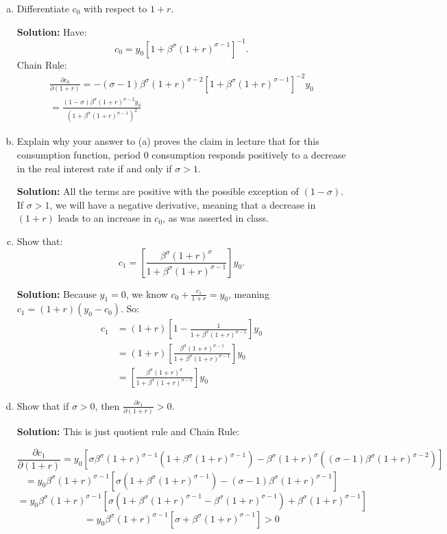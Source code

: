 \documentclass[11pt]{extarticle}
\theoremstyle{plain}
\theoremstyle{definition}
\begin{document}
\begin{enumerate}[(a)]

\item Differentiate $c_0$ with respect to $1+r$.

\textbf{Solution:} Have:
$$
c_0=y_0\left[1+\beta^\sigma(1+r)^{\sigma-1}\right]^{-1} .
$$
Chain Rule:
$$
\begin{array}{r}
\frac{\partial c_0}{\partial(1+r)}=-(\sigma-1) \beta^\sigma(1+r)^{\sigma-2}\left[1+\beta^\sigma(1+r)^{\sigma-1}\right]^{-2} y_0 \\
=\frac{(1-\sigma) \beta^\sigma(1+r)^{\sigma-2} y_0}{\left(1+\beta^\sigma(1+r)^{\sigma-1}\right)^2}
\end{array}
$$

\item Explain why your answer to (a) proves the claim in lecture that for this consumption function, period 0 consumption responds positively to a decrease in the real interest rate if and only if $\sigma>1$. 

\textbf{Solution:} All the terms are positive with the possible exception of $(1-\sigma)$. If $\sigma>1$, we will have a negative derivative, meaning that a decrease in $(1+r)$ leads to an increase in $c_0$, as was asserted in class.

\item  Show that:
$$
c_1=\left[\frac{\beta^\sigma(1+r)^\sigma}{1+\beta^\sigma(1+r)^{\sigma-1}}\right] y_0 .
$$

\textbf{Solution:} Because $y_1=0$, we know $c_0+\frac{c_1}{1+r}=y_0$, meaning $c_1=(1+r)\left(y_0-c_0\right)$. So:
$$
\begin{aligned}
c_1 &=(1+r)\left[1-\frac{1}{1+\beta^\sigma(1+r)^{\sigma-1}}\right] y_0 \\
&=(1+r)\left[\frac{\beta^\sigma(1+r)^{\sigma-1}}{1+\beta^\sigma(1+r)^{\sigma-1}}\right] y_0 \\
&=\left[\frac{\beta^\sigma(1+r)^\sigma}{1+\beta^\sigma(1+r)^{\sigma-1}}\right] y_0
\end{aligned}
$$

\item Show that if $\sigma>0$, then $\frac{\partial c_1}{\partial(1+r)}>0$.

\textbf{Solution:} This is just quotient rule and Chain Rule: 

$$\frac{\partial c_1}{\partial(1+r)}=y_0\left[\sigma \beta^\sigma(1+r)^{\sigma-1}\left(1+\beta^\sigma(1+r)^{\sigma-1}\right)-\beta^\sigma(1+r)^\sigma\left((\sigma-1) \beta^\sigma(1+r)^{\sigma-2}\right)\right]$$
$$=y_0 \beta^\sigma(1+r)^{\sigma-1}\left[\sigma\left(1+\beta^\sigma(1+r)^{\sigma-1}\right)-(\sigma-1) \beta^\sigma(1+r)^{\sigma-1}\right]$$
$$=y_0 \beta^\sigma(1+r)^{\sigma-1}\left[\sigma\left(1+\beta^\sigma(1+r)^{\sigma-1}-\beta^\sigma(1+r)^{\sigma-1}\right)+\beta^\sigma(1+r)^{\sigma-1}\right]$$
$$=y_0 \beta^\sigma(1+r)^{\sigma-1}\left[\sigma+\beta^\sigma(1+r)^{\sigma-1}\right]>0$$


\end{enumerate}
\end{document}
